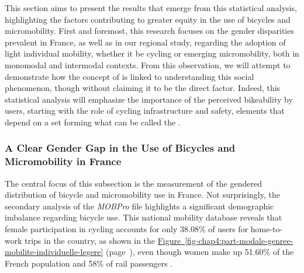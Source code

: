 \begin{refsegment}
This section aims to present the results that emerge from this statistical analysis, highlighting the factors contributing to greater equity in the use of bicycles and micromobility. First and foremost, this research focuses on the gender disparities prevalent in France, as well as in our regional study, regarding the adoption of light individual mobility, whether it be cycling or emerging micromobility, both in monomodal and intermodal contexts. From this observation, we will attempt to demonstrate how the concept of  is linked to understanding this social phenomenon, though without claiming it to be the direct factor. Indeed, this statistical analysis will emphasize the importance of the perceived bikeability by users, starting with the role of cycling infrastructure and safety, elements that depend on a set forming what can be called the . %

\subsubsection*{A Clear Gender Gap in the Use of Bicycles and Micromobility in France
    \label{chap4:ecart-genre}
    }

The central focus of this subsection is the measurement of the gendered distribution of bicycle and micromobility use in France. Not surprisingly, the secondary analysis of the \textsl{MOBPro} file highlights a significant demographic imbalance regarding bicycle use. This national mobility database reveals that female participation in cycling accounts for only 38.08\% of users for home-to-work trips in the country, as shown in the \hyperref[fig-chap4:part-modale-genree-mobilite-individuelle-legere]{Figure~\ref{fig-chap4:part-modale-genree-mobilite-individuelle-legere}} (page~\pageref{fig-chap4:part-modale-genree-mobilite-individuelle-legere}), even though women make up 51.60\% of the French population \textcolor{blue}{\autocite{insee_documentation_2023}} and 58\% of rail passengers \textcolor{blue}{\autocite{enov_enquete_2021}}. %


\end{refsegment}
